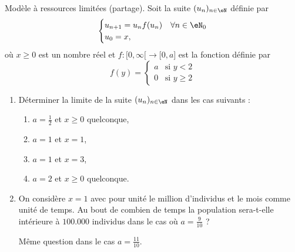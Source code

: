 
\begin{exercice}\label{exoTD3-0008}

	Modèle à ressources limitées (partage). Soit la suite $(u_n)_{n\in\eN}$ définie par
	\begin{equation}
		\begin{cases}
			u_{n+1}=u_nf(u_n)	&	\text{}\forall n\in\eN_0\\
			u_0=x,
		\end{cases}
	\end{equation}
	où $x\geq 0$ est un nombre réel et $f\colon \mathopen[ 0 , \infty [\to \mathopen[ 0 , a \mathclose]$ est la fonction définie par
	\begin{equation}
		f(y)=\begin{cases}
			a	&	\text{si }y<2\\
			0	&	 \text{si }y\geq 2
		\end{cases}
	\end{equation}
	\begin{enumerate}
		\item
			Déterminer la limite de la suite $(u_n)_{n\in\eN}$ dans les cas suivants :
			\begin{enumerate}
				\item
					$a=\frac{ 1 }{2}$ et $x\geq 0$ quelconque,
				\item
					$a=1$ et $x=1$,
				\item
					$a=1$ et $x=3$,
				\item
					$a=2$ et $x\geq 0$ quelconque.
			\end{enumerate}
		\item
			On considère $x=1$ avec pour unité le million d'individus et le mois comme unité de temps. Au bout de combien de temps la population sera-t-elle intérieure à $100.000$ individus dans le cas où $a=\frac{ 9 }{ 10 }$ ?

			Même question dans le cas $a=\frac{ 11 }{ 10 }$.
	\end{enumerate}
	

\end{exercice}

